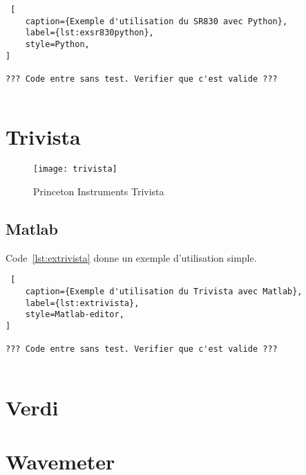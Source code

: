 \documentclass[11pt,francais]{book} %
\begin{document}
\begin{lstlisting} [
    caption={Exemple d'utilisation du SR830 avec Python},
    label={lst:exsr830python},
    style=Python,
]

??? Code entre sans test. Verifier que c'est valide ???
  
\end{lstlisting}


\section{Trivista}

\begin{figure}[htbp]
\centering\texttt{[image: trivista]}
\caption{Princeton Instruments Trivista}
\label{fig:trivista}
\end{figure}

\subsection{Matlab}

Code~\ref{lst:extrivista} donne un exemple d'utilisation simple.

\begin{lstlisting} [
    caption={Exemple d'utilisation du Trivista avec Matlab},
    label={lst:extrivista},
    style=Matlab-editor,
]

??? Code entre sans test. Verifier que c'est valide ???
  
\end{lstlisting}


\section{Verdi}


\section{Wavemeter}\label{wavemeter}
\end{document}
